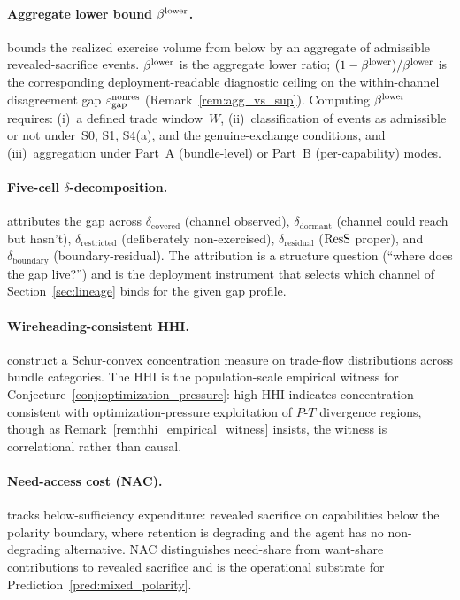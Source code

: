 \paragraph{Aggregate lower bound $\beta^{\mathrm{lower}}$.}
\citep[Theorem~2]{lasser2026paper8a} bounds the realized
exercise volume from below by an aggregate of admissible
revealed-sacrifice events.  $\beta^{\mathrm{lower}}$ is the aggregate lower
ratio; $(1 - \beta^{\mathrm{lower}})/\beta^{\mathrm{lower}}$ is the corresponding
deployment-readable diagnostic ceiling on the within-channel
disagreement gap $\varepsilon_{\mathrm{gap}}^{\mathrm{nonres}}$
(Remark~\ref{rem:agg_vs_sup}).  Computing $\beta^{\mathrm{lower}}$ requires:
(i)~a defined trade window~$W$, (ii)~classification of events
as admissible or not under~S0, S1, S4(a), and the
genuine-exchange conditions, and (iii)~aggregation under
Part~A (bundle-level) or Part~B (per-capability) modes.

\paragraph{Five-cell $\delta$-decomposition.}
\citep[Definition~8]{lasser2026paper8b} attributes the gap
across $\delta_{\mathrm{covered}}$ (channel observed),
$\delta_{\mathrm{dormant}}$ (channel could reach but hasn't),
$\delta_{\mathrm{restricted}}$ (deliberately non-exercised),
$\delta_{\mathrm{residual}}$ ($\mathrm{ResS}$ proper), and
$\delta_{\mathrm{boundary}}$ (boundary-residual).  The
attribution is a structure question (``where does the gap
live?'') and is the deployment instrument that selects which
channel of Section~\ref{sec:lineage} binds for the given gap
profile.

\paragraph{Wireheading-consistent HHI.}
\citep[Propositions~6~and~7]{lasser2026paper8b} construct a
Schur-convex concentration measure on trade-flow distributions
across bundle categories.  The HHI is the population-scale
empirical witness for Conjecture~\ref{conj:optimization_pressure}: high HHI
indicates concentration consistent with optimization-pressure
exploitation of $P$-$T$ divergence regions, though as
Remark~\ref{rem:hhi_empirical_witness} insists, the witness is
correlational rather than causal.

\paragraph{Need-access cost (NAC).}
\citep[Definition~9]{lasser2026paper8b} tracks below-sufficiency
expenditure: revealed sacrifice on capabilities below the
polarity boundary, where retention is degrading and the agent
has no non-degrading alternative.  NAC distinguishes need-share
from want-share contributions to revealed sacrifice and is the
operational substrate for Prediction~\ref{pred:mixed_polarity}.

